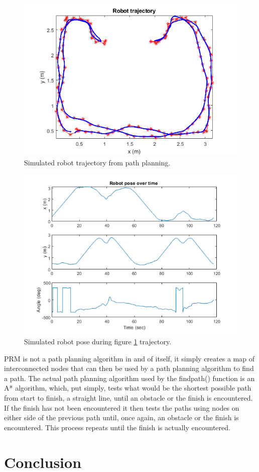\documentclass{ieeeaccess}
\begin{document}
\begin{figure}
   	\captionsetup{width=\columnwidth}
  	\centering
  	\includegraphics[width=\columnwidth]{./graphics/Prac7_8Trajectory.png}
  	\caption{Simulated robot trajectory from path planning.}
   	\label{fig:tra1}
\end{figure}\begin{figure}
   	\captionsetup{width=\columnwidth}
  	\centering
  	\includegraphics[width=\columnwidth]{./graphics/Prac7_8Pose.png}
  	\caption{Simulated robot pose during figure \ref{fig:tra1} trajectory.}
   	\label{fig:pos1}
\end{figure}

PRM is not a path planning algorithm in and of itself, it simply creates a map of interconnected nodes that can then be used by a path planning algorithm to find a path. The actual path planning algorithm used by the findpath() function is an A* algorithm, which, put simply, tests what would be the shortest possible path from start to finish, a straight line, until an obstacle or the finish is encountered. If the finish has not been encountered it then tests the paths using nodes on either side of the previous path until, once again, an obstacle or the finish is encountered. This process repeats until the finish is actually encountered.\par
\section{Conclusion}
\label{sec:con}

\EOD
\end{document}
